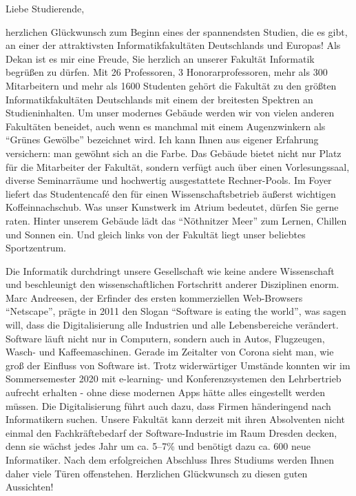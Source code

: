 {\fontsize{10pt}{11}\selectfont

Liebe Studierende,

herzlichen Glückwunsch zum Beginn eines der spannendsten Studien, die es gibt, an  einer der attraktivsten Informatikfakultäten Deutschlands und Europas!  Als Dekan ist es mir eine Freude, Sie herzlich an unserer Fakultät  Informatik begrüßen zu dürfen. Mit 26 Professoren, 3 Honorarprofessoren, mehr als 300 Mitarbeitern und mehr als 1600 Studenten gehört die  Fakultät zu den größten Informatikfakultäten Deutschlands mit einem der  breitesten Spektren an Studieninhalten. Um unser modernes Gebäude werden wir von vielen anderen Fakultäten beneidet, auch wenn es manchmal mit  einem Augenzwinkern als \enquote{Grünes Gewölbe} bezeichnet wird. Ich  kann Ihnen aus eigener Erfahrung versichern: man gewöhnt sich an die  Farbe. Das Gebäude bietet nicht nur Platz für die Mitarbeiter der  Fakultät, sondern verfügt auch über einen Vorlesungssaal, diverse  Seminarräume und hochwertig ausgestattete Rechner-Pools. Im Foyer  liefert das Studentencafé \ascii{} den für einen Wissenschaftsbetrieb  äußerst wichtigen Koffeinnachschub. Was unser Kunstwerk im Atrium  bedeutet, dürfen Sie gerne raten. Hinter unserem Gebäude lädt das  \enquote{Nöthnitzer Meer} zum Lernen, Chillen und Sonnen ein. Und gleich links von der Fakultät liegt unser beliebtes Sportzentrum.

Die Informatik durchdringt unsere Gesellschaft wie keine andere  Wissenschaft und beschleunigt den wissenschaftlichen Fortschritt anderer Disziplinen enorm. Marc Andreesen, der Erfinder des ersten  kommerziellen Web-Browsers \enquote{Netscape}, prägte in 2011 den Slogan \enquote{Software is eating the world}, was sagen will, dass die  Digitalisierung alle Industrien und alle Lebensbereiche verändert.  Software läuft nicht nur in Computern, sondern auch in Autos,  Flugzeugen, Wasch- und Kaffeemaschinen. Gerade im Zeitalter von Corona sieht man, wie groß der Einfluss von  Software ist. Trotz widerwärtiger Umstände konnten wir im Sommersemester 2020 mit e-learning- und Konferenzsystemen den Lehrbertrieb aufrecht erhalten - ohne diese modernen Apps hätte alles eingestellt werden müssen. Die Digitalisierung führt auch dazu, dass  Firmen händeringend nach Informatikern suchen. Unsere Fakultät kann  derzeit mit ihren Absolventen nicht einmal den Fachkräftebedarf der  Software-Industrie im Raum Dresden decken, denn sie wächst jedes Jahr um ca. 5--7\% und benötigt dazu ca. 600 neue Informatiker. Nach dem  erfolgreichen Abschluss Ihres Studiums werden Ihnen daher viele Türen  offenstehen. Herzlichen Glückwunsch zu diesen guten Aussichten!

}
